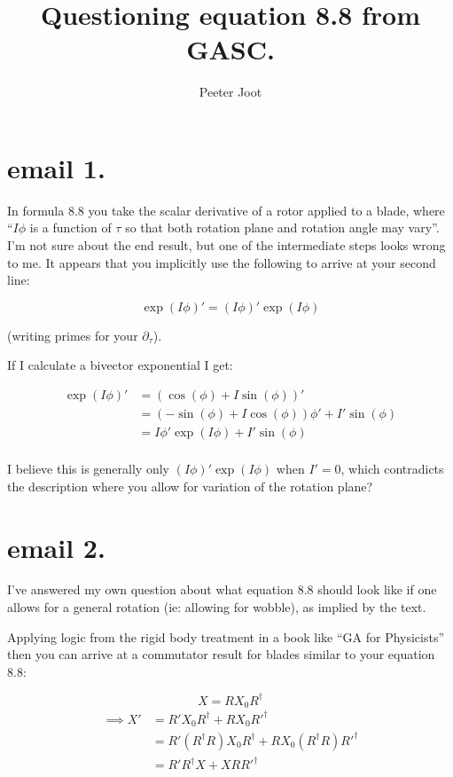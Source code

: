 \documentclass{article}      %
\title{ Questioning equation 8.8 from GASC. } %
\author{Peeter Joot}         %
\newcommand{\Sin}[1]{\sin{\left({#1}\right)}}
\newcommand{\Cos}[1]{\cos{\left({#1}\right)}}
\newcommand{\Exp}[1]{\exp{\left({#1}\right)}}
\begin{document}

\maketitle{}

\section{ email 1. }

In formula 8.8 you take the scalar derivative of a rotor applied to a blade, where ``$I \phi$ is a function of $\tau$ so that both rotation plane and rotation angle may vary''.  I'm not sure about the end result, but one of the intermediate steps looks wrong to me.  It appears that you implicitly use the following to arrive at your second line:

\[
\Exp{ I \phi }' = ( I \phi )' \Exp{ I \phi }
\]

(writing primes for your $\partial_\tau$).

If I calculate a bivector exponential I get:

\begin{align*}
\Exp{ I \phi }'
&= (\Cos{\phi} + I \Sin{\phi})' \\
&= (-\Sin{\phi} + I \Cos{\phi}) \phi' + I' \Sin{\phi} \\
&= I \phi' \Exp{ I \phi } + I' \Sin{\phi} \\
\end{align*}

I believe this is generally only $(I \phi)' \Exp{ I \phi }$ when $I' = 0$, which contradicts the description where you allow for variation of the rotation plane?

\section{ email 2. } 

I've answered my own question about what equation 8.8 should look like if one allows for a general rotation (ie: allowing for wobble), as implied by the text.

Applying logic from the rigid body treatment in a book like ``GA for Physicists'' then you can arrive at a commutator result for blades similar to your equation 8.8:

\[
X = R X_0 R^\dagger
\]
\begin{align*}
\implies
X' &= R' X_0 R^\dagger + R X_0 {R'}^\dagger \\
   &= R' (R^\dagger R) X_0 R^\dagger + R X_0 (R^\dagger R) {R'}^\dagger \\
   &= R' R^\dagger X + X R {R'}^\dagger \\
\end{align*}
\end{document}
